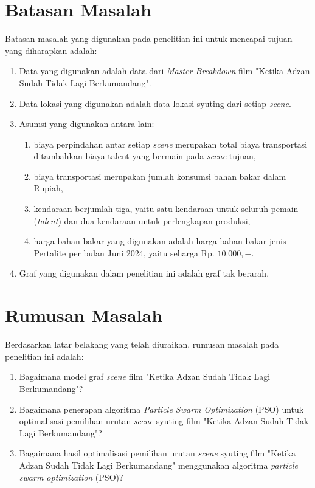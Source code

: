 \section{Batasan Masalah}
\vspace{-4mm}
{\frenchspacing
    Batasan masalah yang digunakan pada penelitian ini untuk mencapai tujuan yang diharapkan adalah:

    \begin{enumerate}[left = 0em, align = left, nolistsep]
        \item Data yang digunakan adalah data dari \textit{Master Breakdown} film "Ketika Adzan Sudah Tidak Lagi Berkumandang".
        \item Data lokasi yang digunakan adalah data lokasi syuting dari setiap \textit{scene}.
        \item Asumsi yang digunakan antara lain:
              \begin{enumerate}[align = left, label=(\alph*), nolistsep]
                  \item biaya perpindahan antar setiap \textit{scene} merupakan total biaya transportasi ditambahkan biaya talent yang bermain pada \textit{scene} tujuan,
                  \item biaya transportasi merupakan jumlah konsumsi bahan bakar dalam Rupiah,
                  \item kendaraan berjumlah tiga, yaitu satu kendaraan untuk seluruh pemain (\textit{talent}) dan dua kendaraan untuk perlengkapan produksi,
                  \item harga bahan bakar yang digunakan adalah harga bahan bakar jenis Pertalite per bulan Juni 2024, yaitu seharga Rp. $10.000,-$.
              \end{enumerate}
        \item Graf yang digunakan dalam penelitian ini adalah graf tak berarah.
    \end{enumerate}
}
\vspace{-4mm}


\section{Rumusan Masalah}
\vspace{-4mm}
{\frenchspacing
    Berdasarkan latar belakang yang telah diuraikan, rumusan masalah pada penelitian ini adalah:

    \begin{enumerate}[left = 0em, align = left, nolistsep]
        \item Bagaimana model graf \textit{scene} film "Ketika Adzan Sudah Tidak Lagi Berkumandang"?
        \item Bagaimana penerapan algoritma \textit{Particle Swarm Optimization} (PSO) untuk optimalisasi pemilihan urutan \textit{scene} syuting film "Ketika Adzan Sudah Tidak Lagi Berkumandang"?
        \item Bagaimana hasil optimalisasi pemilihan urutan \textit{scene} syuting film "Ketika Adzan Sudah Tidak Lagi Berkumandang" menggunakan algoritma \textit{particle swarm optimization} (PSO)?
    \end{enumerate}
}
\vspace{-4mm}

